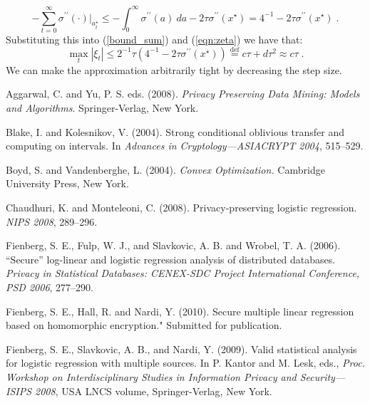 \documentclass[11pt]{article}
\begin{document}
$$-\sum_{t=0}^\infty\sigma^{\prime\prime}(\cdot)|_{a^\star_t} \leq -\int_0^\infty \sigma^{\prime\prime}(a)\ da - 2\tau\sigma^{\prime\prime}(x^\star)
= 4^{-1} - 2\tau\sigma^{\prime\prime}(x^\star)
\; .
$$
Substituting this into (\ref{bound_sum}) and (\ref{eqn:zeta}) we have that:
\begin{equation}\label{euler_bound}\max_t|\xi_t| \leq 2^{-1}\tau(4^{-1} - 2\tau\sigma^{\prime\prime}(x^\star)) \stackrel{\text{def}}{=} c\tau + d\tau^2 \approx c\tau \; .
\end{equation}
We can make  the approximation arbitrarily tight by decreasing the step size.




\newpage
\begin{thebibliography}{99}

 

 Aggarwal, C.  and  Yu, P. S. eds. (2008). \textit{Privacy Preserving Data Mining: Models and Algorithms}.   Springer-Verlag, New York.

 Blake, I. and Kolesnikov, V. (2004). Strong conditional oblivious transfer and computing on intervals. In \textit{Advances in Cryptology---ASIACRYPT 2004}, 515--529.

 Boyd, S. and Vandenberghe, L. (2004).  \textit{Convex Optimization.}  Cambridge University Press, New York.

 Chaudhuri, K. and  Monteleoni, C. (2008).  Privacy-preserving logistic regression. \textit{NIPS 2008},  289--296.

Fienberg, S. E.,  Fulp, W. J., and Slavkovic, A. B. and Wrobel, T. A. (2006).  ``{S}ecure'' log-linear and logistic regression analysis of distributed databases. \textit{Privacy in Statistical Databases: CENEX-SDC Project International Conference, PSD 2006}, 277--290.

 Fienberg, S. E., Hall, R. and Nardi, Y. (2010).  Secure multiple linear regression based on homomorphic encryption."  Submitted for publication.

Fienberg, S. E., Slavkovic, A. B., and  Nardi, Y. (2009).  Valid statistical analysis for logistic regression with multiple sources. In P. Kantor and M. Lesk, eds.,  \textit{Proc. Workshop on Interdisciplinary Studies in Information Privacy and Security---ISIPS 2008}, USA  LNCS volume, Springer-Verlag, New York.



\end{thebibliography}
\end{document}
